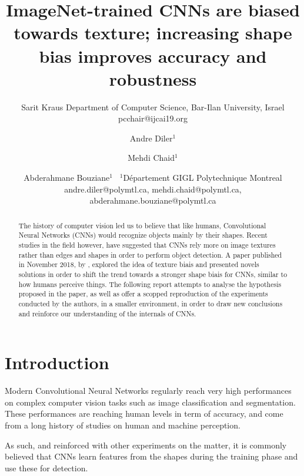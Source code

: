 \documentclass{article}
\title{ImageNet-trained CNNs are biased towards texture; increasing shape bias improves accuracy and robustness}
\author{
    Sarit Kraus
    \affiliations
    Department of Computer Science, Bar-Ilan University, Israel \emails
    pcchair@ijcai19.org
}
\author{
Andre Diler$^1$
\and
Mehdi Chaid$^1$\and
Abderahmane Bouziane$^1$\
\affiliations
$^1$Département GIGL Polytechnique Montreal\\
\emails
andre.diler@polymtl.ca,
mehdi.chaid@polymtl.ca,
abderahmane.bouziane@polymtl.ca
}
\begin{document}
\maketitle

\begin{abstract}

The history of computer vision led us to believe that like humans, 
Convolutional Neural Networks (CNNs) would recognize objects mainly by their shapes.
Recent studies in the field however, have  suggested that CNNs rely more on image textures 
rather than edges and shapes in order to perform object detection. 
A paper published in November 2018, by \cite{geirhos2018imagenettrained}, explored the idea of texture biais
and presented novels solutions in order to shift the trend towards a stronger shape biais for CNNs, similar to 
how humans perceive things.
The following report attempts to analyse the hypothesis proposed in the paper, 
as well as offer a scopped reproduction of the experiments conducted by the authors, in a smaller environment, 
in order to draw new conclusions and reinforce our understanding of the internals of CNNs.
\end{abstract}

\section{Introduction}


Modern Convolutional Neural Networks regularly reach very high performances on complex computer vision tasks 
such as image classification and segmentation.
These performances are reaching human levels in term of accuracy, and come from a long history of studies 
on human and machine perception. \medskip \par 

\noindent
As such, and reinforced with other experiments on the matter, 
it is commonly believed that CNNs learn features from the shapes during the training phase
and use these for detection.
\end{document}
